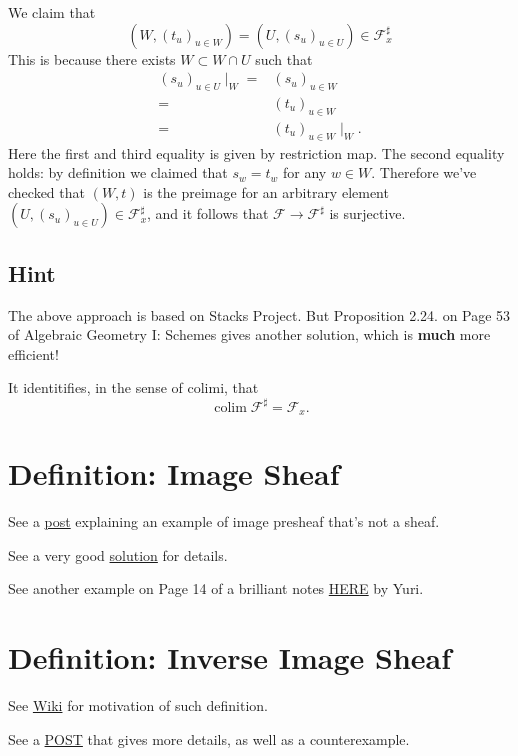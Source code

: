 We claim that \[(W,(t_u)_{u\in W})=(U,(s_u)_{u\in U})\in \mathscr F^{\sharp}_x\]
This is because there exists $W\subset W\cap U$ such that \begin{align*}
    (s_u)_{u\in U}\mid_W =& (s_u)_{u\in W}\\
    =& (t_u)_{u\in W}\\
    =& (t_u)_{u\in W}\mid_W.
\end{align*}Here the first and third equality is given by restriction map. The second equality holds: by definition we claimed that $s_w=t_w$ for any $w\in W$. Therefore we've checked that $(W,t)$ is the preimage for an arbitrary element $(U,(s_u)_{u\in U})\in \mathscr F^{\sharp}_x$, and it follows that $\mathscr F\to\mathscr F^{\sharp}$ is surjective.

\subsection{Hint}

The above approach is based on Stacks Project. But Proposition 2.24. on Page 53 of Algebraic Geometry I: Schemes \cite{gortz2020algebraic} gives another solution, which is \textbf{much} more efficient!

It identitifies, in the sense of colimi, that
\[\operatorname{colim}\mathscr F^{\sharp}=\mathscr F_x.\]
  
\section{Definition: Image Sheaf}

See a \href{https://math.stackexchange.com/questions/3838804/image-presheaf-which-is-not-a-sheaf}{post} explaining an example of image presheaf that's not a sheaf.

See a very good \href{https://www2.math.ethz.ch/education/bachelor/lectures/fs2016/math/alg_geom/Solution12.pdf}{solution} for details.

See another example on Page 14 of a brilliant notes \href{https://pi.math.cornell.edu/~apatotski/7400-notes.pdf}{HERE} by Yuri.

\section{Definition: Inverse Image Sheaf}

See \href{https://en.wikipedia.org/wiki/Inverse_image_functor}{Wiki} for motivation of such definition.

See a \href{https://en.wikipedia.org/wiki/Inverse_image_functor}{POST} that gives more details, as well as a counterexample.

